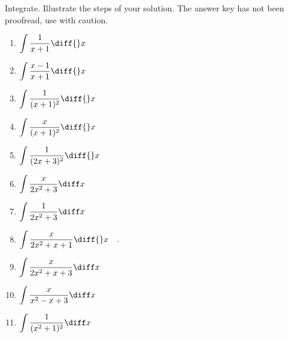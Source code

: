 Integrate. Illustrate the steps of your solution. The answer key has not been proofread, use with caution.
\begin{multicols}{2}
\begin{enumerate}
\item $\displaystyle \int \frac{1}{x+1}\diff {}x$

\item $\displaystyle \int \frac{x-1}{x+1}\diff {}x$


\item $\displaystyle \int \frac{ 1}{(x+1)^2}\diff {}x$


\item $\displaystyle \int \frac{x}{(x+1)^2}\diff {}x$


\item $\displaystyle \int \frac{ 1}{ (2x+3)^2}\diff {}x$

\item $\displaystyle
\int \frac{x}{ 2x^2+3}\diff x
$


\item $\displaystyle
\int \frac{1}{ 2x^2+3}\diff x
$


\item \label{problemIntegrate x/(2x^2+x+1) dx}
$\displaystyle\int \frac{x }{2x^2+x+1}\diff{}x\quad .
$



\item $\displaystyle
\int \frac{x}{ 2x^2+x+3}\diff x
$

\item $\displaystyle
\int \frac{x}{ x^2-x+3}\diff x
$

\item $\displaystyle
\int \frac{1}{ (x^2+1)^2}\diff x
$


\end{enumerate}
\end{multicols}
